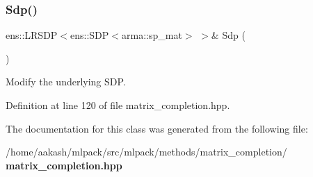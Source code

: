 \mbox{\label{classmlpack_1_1matrix__completion_1_1MatrixCompletion_a67f1f8713360e9c83a12f1ad735d7f8d}} 
\subsubsection{Sdp()\hspace{0.1cm}{\footnotesize\ttfamily [2/2]}}
{\footnotesize\ttfamily ens\+::\+L\+R\+S\+DP$<$ens\+::\+S\+DP$<$arma\+::sp\+\_\+mat$>$ $>$\& Sdp (\begin{DoxyParamCaption}{ }\end{DoxyParamCaption})\hspace{0.3cm}{\ttfamily [inline]}}



Modify the underlying S\+DP. 



Definition at line 120 of file matrix\+\_\+completion.\+hpp.



The documentation for this class was generated from the following file\+:\begin{DoxyCompactItemize}
\item 
/home/aakash/mlpack/src/mlpack/methods/matrix\+\_\+completion/\textbf{ matrix\+\_\+completion.\+hpp}\end{DoxyCompactItemize}
